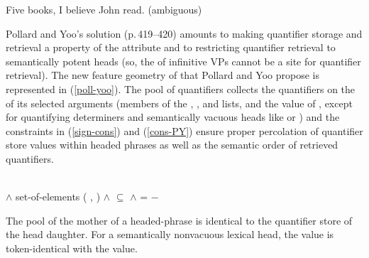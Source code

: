 \documentclass[output=paper
	        ,collection
	        ,collectionchapter
 	        ,biblatex
                ,babelshorthands
                ,newtxmath
                ,draftmode
                ,colorlinks, citecolor=brown
]{langscibook}
\begin{document}
\begin{exe}
\ex\label{ext-sc}
Five books, I believe John read. (ambiguous)
\end{exe}

Pollard and Yoo's solution (p.\,419--420) amounts to making quantifier storage and retrieval a property of the  attribute and to restricting quantifier retrieval to semantically potent heads (so, the  of infinitive VPs cannot be a site for quantifier retrieval). The new feature geometry of  that Pollard and Yoo propose is represented in (\ref{poll-yoo}). The pool of quantifiers collects the quantifiers on the  of its selected arguments (members of the , , and  lists, and the value of , except for quantifying determiners and semantically vacuous heads like  or ) and the constraints in (\ref{sign-cons}) and (\ref{cons-PY}) \citep[423]{PollardandYoo1998} ensure proper percolation of quantifier store values within headed phrases as well as the semantic order of retrieved quantifiers.

\begin{exe}
\ex\label{poll-yoo}

\end{exe}

\begin{exe}
\ex\label{sign-cons}
 \\
$\land$ set-of-elements ( , )
$\land$  $\subseteq$ 
$\land$  =  $-$ 
\end{exe}

\begin{exe}
\ex\label{cons-PY}
\begin{xlist}
\ex \label{cons-PYa} The pool of the mother of a headed-phrase is identical to the quantifier store of the head daughter. 
\ex \label{cons-PYb} For a semantically nonvacuous lexical head, the  value is token-identical with the  value.
\end{xlist}
\end{exe}
\end{document}
